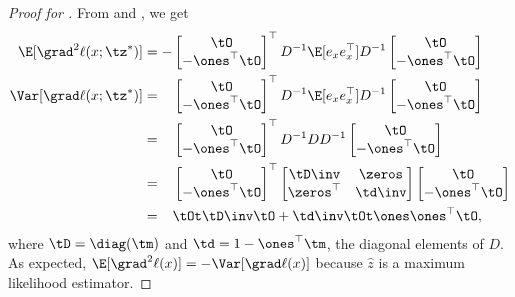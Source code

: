 \begin{proof}[Proof for ]
From  and , we get
  \begin{align*}
    \E[\grad^2 \ell(x; \tz^*)] 
    &= -
        \begin{bmatrix}
          \tO \\
          -\ones^\top \tO
        \end{bmatrix}^\top
          D^{-1} \E[e_x e_x^\top] D^{-1} 
        \begin{bmatrix}
          \tO \\
          -\ones^\top \tO
        \end{bmatrix} \\
    \Var [\grad \ell(x; \tz^*)] 
    &= \hphantom{-}
        \begin{bmatrix}
          \tO \\
          -\ones^\top \tO
        \end{bmatrix}^\top
          D^{-1} \E[e_x e_x^\top] D^{-1} 
        \begin{bmatrix}
          \tO \\
          -\ones^\top \tO
        \end{bmatrix} \\
    &= \hphantom{-}
        \begin{bmatrix}
          \tO \\
          -\ones^\top \tO
        \end{bmatrix}^\top
          D^{-1} D D^{-1} 
        \begin{bmatrix}
          \tO \\
          -\ones^\top \tO
        \end{bmatrix} \\
    &= \hphantom{-}
        \begin{bmatrix}
          \tO \\
          - \ones^\top \tO
        \end{bmatrix}^\top
        \begin{bmatrix}
          \tD\inv & \zeros \\
          \zeros^\top & \td\inv
        \end{bmatrix}
        \begin{bmatrix}
          \tO \\
          - \ones^\top \tO
        \end{bmatrix} \\
        &= \hphantom{-} 
          \tOt \tD\inv \tO + \td\inv \tOt \ones \ones^\top \tO,
  \end{align*}
where $\tD = \diag(\tm)$ and $\td = 1 - \ones^\top \tm$, the diagonal
  elements of $D$.
As expected, $\E[\grad^2 \ell(x)] = -\Var [\grad \ell(x)]$ because
$\hat{z}$ is a maximum likelihood estimator. 


\end{proof}
